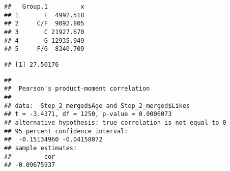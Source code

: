 \documentclass[
]{article}
\newenvironment{Shaded}{\begin{snugshade}}{\end{snugshade}}
\newcommand{\AttributeTok}[1]{\textcolor[rgb]{0.77,0.63,0.00}{#1}}
\newcommand{\CommentTok}[1]{\textcolor[rgb]{0.56,0.35,0.01}{\textit{#1}}}
\newcommand{\FunctionTok}[1]{\textcolor[rgb]{0.00,0.00,0.00}{#1}}
\newcommand{\NormalTok}[1]{#1}
\newcommand{\SpecialCharTok}[1]{\textcolor[rgb]{0.00,0.00,0.00}{#1}}
\newcommand{\StringTok}[1]{\textcolor[rgb]{0.31,0.60,0.02}{#1}}
\begin{document}
\begin{Shaded}
\end{Shaded}

\begin{verbatim}
##   Group.1         x
## 1       F  4992.518
## 2     C/F  9092.805
## 3       C 21927.670
## 4       G 12935.949
## 5     F/G  8340.709
\end{verbatim}

\begin{Shaded}
\end{Shaded}

\begin{verbatim}
## [1] 27.50176
\end{verbatim}

\begin{Shaded}
\end{Shaded}

\begin{verbatim}
## 
##  Pearson's product-moment correlation
## 
## data:  Step_2_merged$Age and Step_2_merged$Likes
## t = -3.4371, df = 1250, p-value = 0.0006073
## alternative hypothesis: true correlation is not equal to 0
## 95 percent confidence interval:
##  -0.15134960 -0.04158072
## sample estimates:
##         cor 
## -0.09675937
\end{verbatim}
\end{document}
